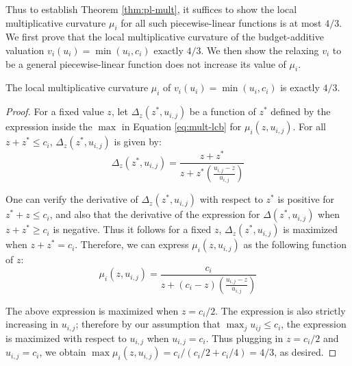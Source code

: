 Thus to establish Theorem \ref{thm:pl-mult}, it suffices to show the local multiplicative curvature $\mu_i$ for all such piecewise-linear functions is at most $4/3$. We first prove that the local multiplicative curvature of the budget-additive valuation $v_i(u_i) = \min(u_i, c_i)$ exactly $4/3$.
We then show the relaxing $v_i$ to be a general piecewise-linear function does not increase its value of $\mu_i$.


\begin{lemma} \label{fact:budget-3/4}
The local multiplicative curvature $\mu_i$ of $v_i(u_i) = \min(u_i,c_i)$ is exactly $4/3$.
\end{lemma}

\begin{proof}
For a fixed value $z$, let $\Delta_z(z^*, u_{i,j})$ be a function of $z^*$ defined by the expression inside the $\max$ in Equation \eqref{eq:mult-lcb} for $\mu_i(z, u_{i,j})$. 
For all $z+z^* \leq c_i$, $\Delta_z(z^*, u_{i,j})$ is given by:
\begin{equation} \label{eq:budget-gap}
\Delta_z(z^*, u_{i,j})  = \frac{z+z^*}{z+ z^*\left(\frac{u_{i,j}-z}{u_{i,j}}\right)}
\end{equation}

One can verify the derivative of $\Delta_z(z^*, u_{i,j})$ with respect to $z^*$ is positive for $z^* + z \leq c_i$, and also that the derivative of the expression for $\Delta(z^*, u_{i,j})$ when $z + z^* \geq c_i$ is negative. Thus it follows for a fixed $z$, $\Delta_z(z^*, u_{i,j})$ is maximized when $z+z^* = c_i$. 
Therefore, 
we can express $\mu_i(z, u_{i,j})$ as the following function of $z$:
\begin{equation} \label{eq:budget-gap-2}
\mu_i(z,u_{i,j})   = \frac{c_i}{z+ (c_i - z)\left(\frac{u_{i,j}-z}{u_{i,j}}\right)}
\end{equation}

The above expression is maximized when $z = c_i/2$. The expression is also strictly increasing in $u_{i,j}$; therefore by our assumption that $\max_{j} u_{ij} \leq c_i$, the expression is maximized with respect to $u_{i,j}$ when $u_{i,j} = c_i$. 
Thus plugging in $z = c_i/2$ and $u_{i,j} = c_i$, we obtain $\max \mu_i(z,u_{i,j}) = c_i/(c_i/2 + c_i/4) = 4/3$, as desired. 
\end{proof}



